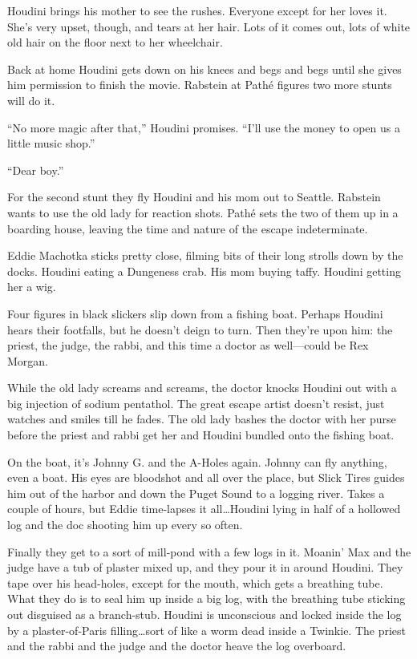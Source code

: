 Houdini brings his mother to see the rushes. Everyone except for her loves it. She’s very upset, though, and tears at her hair. Lots of it comes out, lots of white old hair on the floor next to her wheelchair.

Back at home Houdini gets down on his knees and begs and begs until she gives him permission to finish the movie. Rabstein at Pathé figures two more stunts will do it.

“No more magic after that,” Houdini promises. “I’ll use the money to open us a little music shop.”

“Dear boy.”

For the second stunt they fly Houdini and his mom out to Seattle. Rabstein wants to use the old lady for reaction shots. Pathé sets the two of them up in a boarding house, leaving the time and nature of the escape indeterminate.

Eddie Machotka sticks pretty close, filming bits of their long strolls down by the docks. Houdini eating a Dungeness crab. His mom buying taffy. Houdini getting her a wig.

Four figures in black slickers slip down from a fishing boat. Perhaps Houdini hears their footfalls, but he doesn’t deign to turn. Then they’re upon him: the priest, the judge, the rabbi, and this time a doctor as well—could be Rex Morgan.

While the old lady screams and screams, the doctor knocks Houdini out with a big injection of sodium pentathol. The great escape artist doesn’t resist, just watches and smiles till he fades. The old lady bashes the doctor with her purse before the priest and rabbi get her and Houdini bundled onto the fishing boat.

On the boat, it’s Johnny G. and the A-Holes again. Johnny can fly anything, even a boat. His eyes are bloodshot and all over the place, but Slick Tires guides him out of the harbor and down the Puget Sound to a logging river. Takes a couple of hours, but Eddie time-lapses it all…Houdini lying in half of a hollowed log and the doc shooting him up every so often.

Finally they get to a sort of mill-pond with a few logs in it. Moanin’ Max and the judge have a tub of plaster mixed up, and they pour it in around Houdini. They tape over his head-holes, except for the mouth, which gets a breathing tube. What they do is to seal him up inside a big log, with the breathing tube sticking out disguised as a branch-stub. Houdini is unconscious and locked inside the log by a plaster-of-Paris filling…sort of like a worm dead inside a Twinkie. The priest and the rabbi and the judge and the doctor heave the log overboard.

